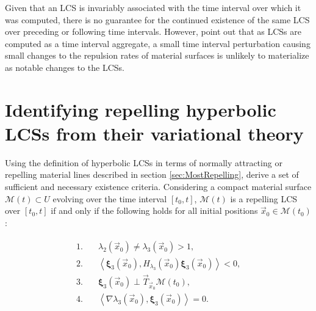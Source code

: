 Given that an LCS is invariably associated with the time interval over which it was computed, there is no guarantee for the continued existence of the same LCS over preceding or following time intervals. However, \cite{Haller12} point out that as LCSs are computed as a time interval aggregate, a small time interval perturbation causing small changes to the repulsion rates of material surfaces is unlikely to materialize as notable changes to the LCSs.

\section{Identifying repelling hyperbolic LCSs from their variational theory}\label{sec:LCS_id}

Using the definition of hyperbolic LCSs in terms of normally attracting or repelling material lines described in section \ref{sec:MostRepelling}, \cite{Haller14Errata} derive a set of sufficient and necessary existence criteria. Considering a compact material surface $\mathcal{M}(t)\subset U$ evolving over the time interval $[t_0,t]$, $\mathcal{M}(t)$ is a repelling LCS over $[t_0,t]$ if and only if the following holds for all initial positions $\vec{x}_0\in \mathcal{M}(t_0)$:

\begin{align}\label{eq:ExistenceConditions}
\begin{aligned}
	1.&\quad \lambda_2(\vec{x}_0) \neq \lambda_3(\vec{x}_0) > 1,\\
	2.&\quad \left\langle \bm{\xi}_3(\vec{x}_0), H_{\lambda_3}(\vec{x}_0)\bm{\xi}_3(\vec{x}_0) \right\rangle  < 0, \\
	3.&\quad \bm{\xi}_3(\vec{x}_0) \perp \vec{T}_{\vec{x}_0}\mathcal{M}(t_0),\\
	4.&\quad \left\langle \nabla\lambda_3(\vec{x}_0), \bm{\xi}_3(\vec{x}_0)\right\rangle = 0.
\end{aligned}
\end{align}

